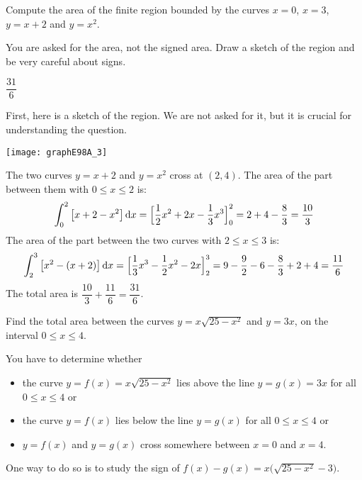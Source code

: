 \begin{question}[1998A]
Compute the area of the finite region bounded by the
curves $x=0$, $x=3$, $y=x+2$ and $y=x^2$.
\end{question}

\begin{hint}
You are asked for the area, not the signed area. Draw a sketch of the region
and be very careful about signs.
\end{hint}

\begin{answer}
$\dfrac{31}{6}$
\end{answer}

\begin{solution}
First, here is a sketch of the region. We are not asked for it, but it
is crucial for understanding the question.
\begin{center}
       \texttt{[image: graphE98A\_3]}
\end{center}
The two curves  $y=x+2$ and $y=x^2$ cross at $(2,4)$.
The area of the part between them with $0\le x\le 2$ is:
\begin{align*}
\int_0^2 \big[x+2-x^2\big]\,\mathrm{d}x=\Big[\frac{1}{2} x^2+2x-\frac{1}{3}x^3\Big]_0^2
=2+4-\frac{8}{3}=\frac{10}{3}
\end{align*}
The area of the part between the two curves with $2\le x\le 3$ is:
\begin{align*}
\int_2^3 \big[x^2-(x+2)\big]\,\mathrm{d}x=\Big[\frac{1}{3}x^3-\frac{1}{2} x^2-2x\Big]_2^3
=9-\frac{9}{2}-6-\frac{8}{3}+2+4=\frac{11}{6}
\end{align*}
The total area is $\dfrac{10}{3}+\dfrac{11}{6}=\dfrac{31}{6}$.

\end{solution}

\begin{question}[2016Q2]
Find the total area between the curves $y = x \sqrt{25-x^2}$ and $y=3x$, on the interval $0\le x\le 4$.
\end{question}

\begin{hint}
You have to determine whether
\begin{itemize}
\item
   the curve $y = f(x) = x \sqrt{25-x^2}$ lies above the line $y=g(x)=3x$ for all          $0\le x\le 4$ or
\item
the curve $y = f(x)$ lies below the line $y=g(x)$ for all $0\le x\le 4$ or
\item  $y=f(x)$ and $y=g(x)$ cross somewhere between $x=0$ and $x=4$.
\end{itemize}
One way to do so is to study the sign of
      $f(x)-g(x) = x\big(\sqrt{25-x^2}-3\big)$.
\end{hint}


